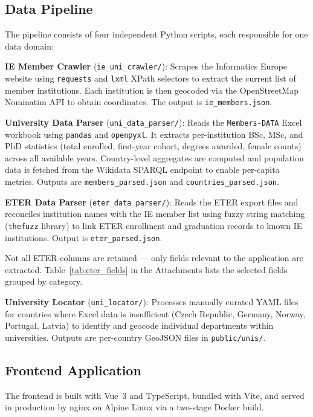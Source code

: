 \documentclass[final,3p,times,twocolumn]{elsarticle}
\begin{document}
\subsection{Data Pipeline}

The pipeline consists of four independent Python scripts, each responsible for one data domain:

\textbf{IE Member Crawler} (\texttt{ie\_uni\_crawler/}): Scrapes the Informatics Europe website using \texttt{requests} and \texttt{lxml} XPath selectors to extract the current list of member institutions. Each institution is then geocoded via the OpenStreetMap Nominatim API to obtain coordinates. The output is \texttt{ie\_members.json}.

\textbf{University Data Parser} (\texttt{uni\_data\_parser/}): Reads the \texttt{Members-DATA} Excel workbook using \texttt{pandas} and \texttt{openpyxl}. It extracts per-institution BSc, MSc, and PhD statistics (total enrolled, first-year cohort, degrees awarded, female counts) across all available years. Country-level aggregates are computed and population data is fetched from the Wikidata SPARQL endpoint to enable per-capita metrics. Outputs are \texttt{members\_parsed.json} and \texttt{countries\_parsed.json}.

\textbf{ETER Data Parser} (\texttt{eter\_data\_parser/}): Reads the ETER export files and reconciles institution names with the IE member list using fuzzy string matching (\texttt{thefuzz} library) to link ETER enrollment and graduation records to known IE institutions. Output is \texttt{eter\_parsed.json}.

Not all ETER columns are retained — only fields relevant to the application are extracted. Table~\ref{tab:eter_fields} in the Attachments lists the selected fields grouped by category.

\textbf{University Locator} (\texttt{uni\_locator/}): Processes manually curated YAML files for countries where Excel data is insufficient (Czech Republic, Germany, Norway, Portugal, Latvia) to identify and geocode individual departments within universities. Outputs are per-country GeoJSON files in \texttt{public/unis/}.

\subsection{Frontend Application}

The frontend is built with Vue~3 and TypeScript, bundled with Vite, and served in production by nginx on Alpine Linux via a two-stage Docker build.
\end{document}
